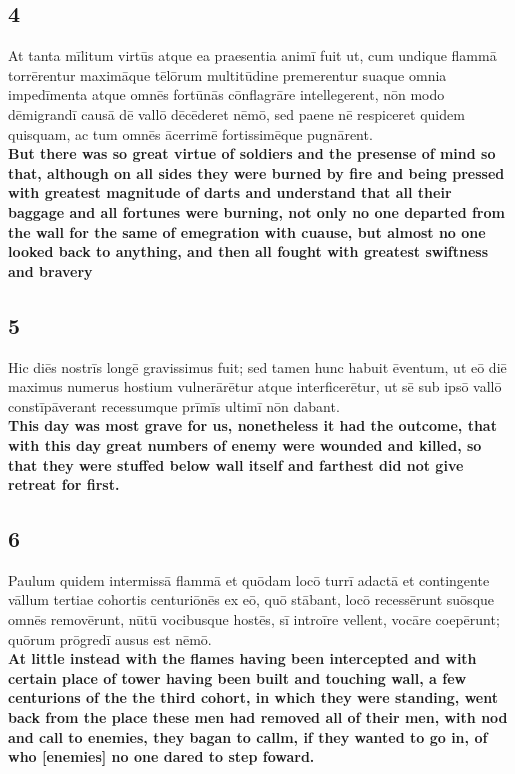 \documentclass{article}
\begin{document}
\subsection*{4}
At tanta mīlitum virtūs atque ea praesentia animī fuit ut, cum undique flammā torrērentur maximāque tēlōrum multitūdine premerentur suaque omnia impedīmenta atque omnēs fortūnās cōnflagrāre intellegerent, nōn modo dēmigrandī causā dē vallō dēcēderet nēmō, sed paene nē respiceret quidem quisquam, ac tum omnēs ācerrimē fortissimēque pugnārent. \\
\textbf{But there was so great virtue of soldiers and the presense of mind so that, although on all sides they were burned by fire and being pressed with greatest magnitude of darts and understand that all their baggage and all fortunes were burning, not only no one departed from the wall for the same of emegration with cuause, but almost no one looked back to anything, and then all fought with greatest swiftness and bravery}

\subsection*{5}
Hic diēs nostrīs longē gravissimus fuit; sed tamen hunc habuit ēventum, ut eō diē maximus numerus hostium vulnerārētur atque interficerētur, ut sē sub ipsō vallō constīpāverant recessumque prīmīs ultimī nōn dabant. \\
\textbf{This day was most grave for us, nonetheless it had the outcome, that with this day great numbers of enemy were wounded and killed, so that they were stuffed below wall itself and farthest did not give retreat for first.}

\subsection*{6}
Paulum quidem intermissā flammā et quōdam locō turrī adactā et contingente vāllum tertiae cohortis centuriōnēs ex eō, quō stābant, locō recessērunt suōsque omnēs removērunt, nūtū vocibusque hostēs, sī introīre vellent, vocāre coepērunt; quōrum prōgredī ausus est nēmō. \\
\textbf{At little instead with the flames having been intercepted and with certain place of tower having been built and touching wall, a few centurions of the the third cohort, in which they were standing, went back from the place these men had removed all of their men, with nod and call to enemies, they bagan to callm, if they wanted to go in, of who [enemies] no one dared to step foward.}
\end{document}
